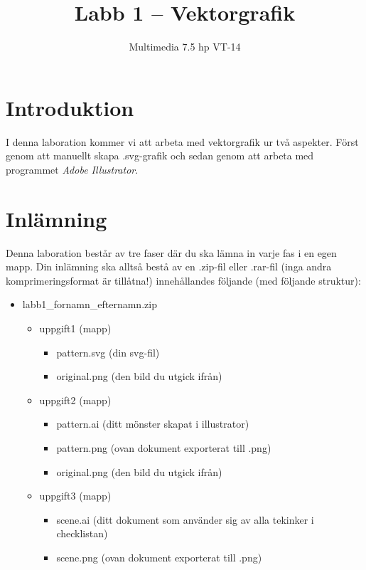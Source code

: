 \documentclass[12pt]{article}
\date{}
\title{ Labb 1 -- Vektorgrafik }
\author{ Multimedia 7.5 hp VT-14 }
\begin{document}
\maketitle
\vspace{-2em}



\section{Introduktion}
I denna laboration kommer vi att arbeta med vektorgrafik ur två aspekter. Först genom att manuellt skapa .svg-grafik och sedan genom att arbeta med programmet \emph{Adobe Illustrator}.

\section{Inlämning}
Denna laboration består av tre faser där du ska lämna in varje fas i en egen mapp. Din inlämning ska alltså bestå av en .zip-fil eller .rar-fil (inga andra komprimeringsformat är tillåtna!) innehållandes följande (med följande struktur):
  \begin{itemize}
    \item labb1\_fornamn\_efternamn.zip

      \begin{itemize}
        \item uppgift1 (mapp)
          \begin{itemize}
            \item pattern.svg (din svg-fil)
            \item original.png (den bild du utgick ifrån)
          \end{itemize}

        \item uppgift2 (mapp)
          \begin{itemize}
            \item pattern.ai (ditt mönster skapat i illustrator)
            \item pattern.png (ovan dokument exporterat till .png)
            \item original.png (den bild du utgick ifrån)
          \end{itemize}

        \item uppgift3 (mapp)
          \begin{itemize}
            \item scene.ai (ditt dokument som använder sig av alla tekinker i checklistan)
            \item scene.png (ovan dokument exporterat till .png)
          \end{itemize}

    \end{itemize}

  \end{itemize}
\end{document}
